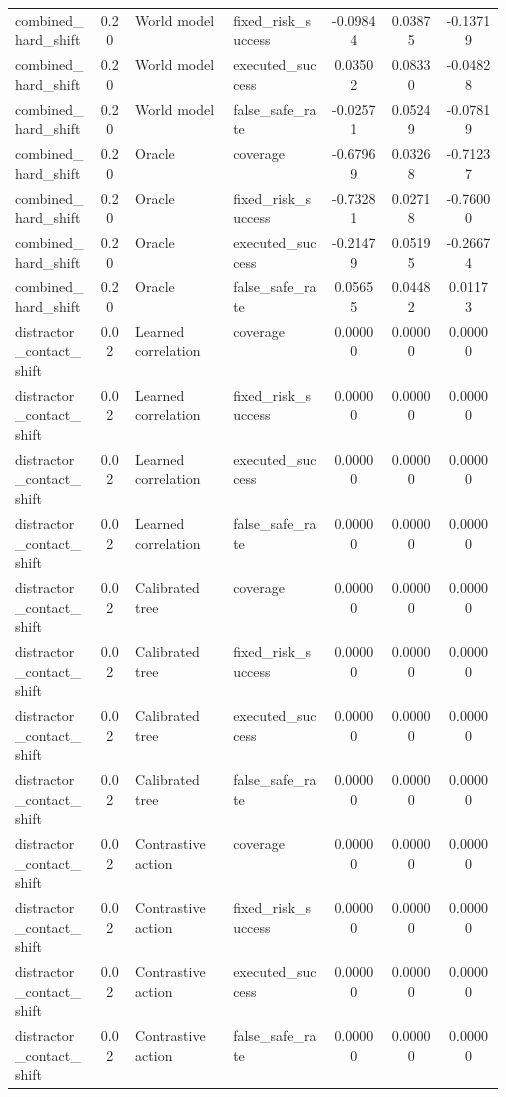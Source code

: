 \documentclass{article}
\begin{document}
\begin{center}
\begin{longtable}{p{0.17\linewidth}cp{0.20\linewidth}p{0.20\linewidth}ccc}
combined\_hard\_shift & 0.20 & World model & fixed\_risk\_success & -0.09844 & 0.03875 & -0.13719\\
combined\_hard\_shift & 0.20 & World model & executed\_success & 0.03502 & 0.08330 & -0.04828\\
combined\_hard\_shift & 0.20 & World model & false\_safe\_rate & -0.02571 & 0.05249 & -0.07819\\
combined\_hard\_shift & 0.20 & Oracle & coverage & -0.67969 & 0.03268 & -0.71237\\
combined\_hard\_shift & 0.20 & Oracle & fixed\_risk\_success & -0.73281 & 0.02718 & -0.76000\\
combined\_hard\_shift & 0.20 & Oracle & executed\_success & -0.21479 & 0.05195 & -0.26674\\
combined\_hard\_shift & 0.20 & Oracle & false\_safe\_rate & 0.05655 & 0.04482 & 0.01173\\
distractor\_contact\_shift & 0.02 & Learned correlation & coverage & 0.00000 & 0.00000 & 0.00000\\
distractor\_contact\_shift & 0.02 & Learned correlation & fixed\_risk\_success & 0.00000 & 0.00000 & 0.00000\\
distractor\_contact\_shift & 0.02 & Learned correlation & executed\_success & 0.00000 & 0.00000 & 0.00000\\
distractor\_contact\_shift & 0.02 & Learned correlation & false\_safe\_rate & 0.00000 & 0.00000 & 0.00000\\
distractor\_contact\_shift & 0.02 & Calibrated tree & coverage & 0.00000 & 0.00000 & 0.00000\\
distractor\_contact\_shift & 0.02 & Calibrated tree & fixed\_risk\_success & 0.00000 & 0.00000 & 0.00000\\
distractor\_contact\_shift & 0.02 & Calibrated tree & executed\_success & 0.00000 & 0.00000 & 0.00000\\
distractor\_contact\_shift & 0.02 & Calibrated tree & false\_safe\_rate & 0.00000 & 0.00000 & 0.00000\\
distractor\_contact\_shift & 0.02 & Contrastive action & coverage & 0.00000 & 0.00000 & 0.00000\\
distractor\_contact\_shift & 0.02 & Contrastive action & fixed\_risk\_success & 0.00000 & 0.00000 & 0.00000\\
distractor\_contact\_shift & 0.02 & Contrastive action & executed\_success & 0.00000 & 0.00000 & 0.00000\\
distractor\_contact\_shift & 0.02 & Contrastive action & false\_safe\_rate & 0.00000 & 0.00000 & 0.00000\\

\end{longtable}
\end{center}
\end{document}
